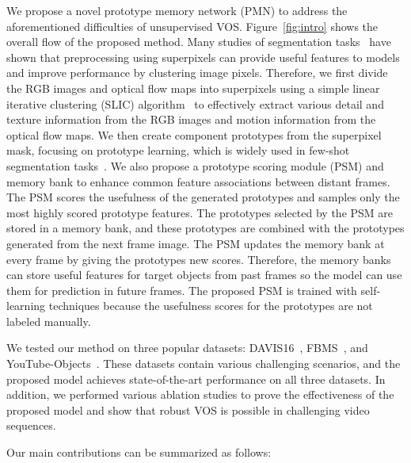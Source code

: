 \documentclass[10pt,twocolumn,letterpaper]{article}
\begin{document}
We propose a novel prototype memory network (PMN) to address the aforementioned difficulties of unsupervised VOS. Figure~\ref{fig:intro} shows the overall flow of the proposed method. Many studies of segmentation tasks~\cite{tu2018learning, bailoni2022gasp, yang2020superpixel} have shown that preprocessing using superpixels can provide useful features to models and improve performance by clustering image pixels. Therefore, we first divide the RGB images and optical flow maps into superpixels using a simple linear iterative clustering (SLIC) algorithm~\cite{achanta2012slic} to effectively extract various detail and texture information from the RGB images and motion information from the optical flow maps. We then create component prototypes from the superpixel mask, focusing on prototype learning, which is widely used in few-shot segmentation tasks~\cite{dong2018few, wang2019panet, liu2020part}. We also propose a prototype scoring module (PSM) and memory bank to enhance common feature associations between distant frames. The PSM scores the usefulness of the generated prototypes and samples only the most highly scored prototype features. The prototypes selected by the PSM are stored in a memory bank, and these prototypes are combined with the prototypes generated from the next frame image. The PSM updates the memory bank at every frame by giving the prototypes new scores. Therefore, the memory banks can store useful features for target objects from past frames so the model can use them for prediction in future frames. The proposed PSM is trained with self-learning techniques because the usefulness scores for the prototypes are not labeled manually.

We tested our method on three popular datasets: DAVIS16~\cite{perazzi2016benchmark}, FBMS~\cite{ochs2013segmentation}, and YouTube-Objects~\cite{prest2012learning}. These datasets contain various challenging scenarios, and the proposed model achieves state-of-the-art performance on all three datasets. In addition, we performed various ablation studies to prove the effectiveness of the proposed model and show that robust VOS is possible in challenging video sequences.

Our main contributions can be summarized as follows:
\end{document}

